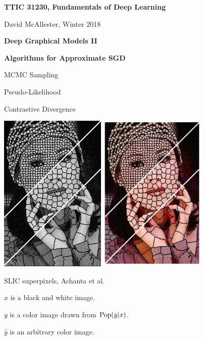 





{\Huge

  \centerline{\bf TTIC 31230, Fundamentals of Deep Learning}
  \bigskip
  \centerline{David McAllester, Winter 2018}
  \vfill
  \centerline{\bf Deep Graphical Models II}
  \vfill
  \centerline{\bf Algorithms for Approximate SGD}
  \vfill
  \centerline{MCMC Sampling}
  \vfill
  \centerline{Pseudo-Likelihood}
  \vfill
  \centerline{Contrastive Divergence}
\vfill


\centerline{\includegraphics[height = 3in]{../images/SLIC} \hspace{.5in} \includegraphics[height = 3in]{../images/SLICcolor}}
\centerline{\huge SLIC superpixels, Achanta et al.}

$x$ is a black and white image.

\vfill
$y$ is a color image drawn from $\mathrm{Pop}(y|x)$.

\vfill
$\hat{y}$ is an arbitrary color image.

}
